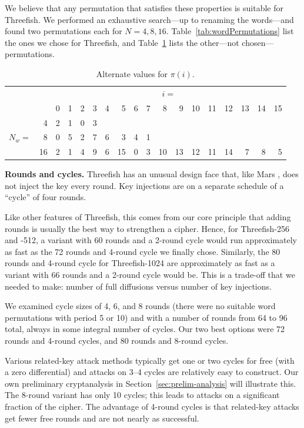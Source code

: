\documentclass[11pt,twoside]{article}
\begin{document}
We believe that any permutation that satisfies these properties is suitable for Threefish.  We performed an exhaustive search---up to renaming the words---and found two permutations each for $N=4,8,16$.  Table~\ref{tab:wordPermutations} list the ones we chose for Threefish, and Table~\ref{tab:altwordPermutations} lists the other---not chosen---permutations.
%
\begin{table}[htb]
  \begin{center}
    \begin{tabular}{|r@{\,\,}r|rrrrrrrrrrrrrrrr|}
    \hline
    &&\multicolumn{16}{c|}{$i=$}\\
    &&0&1&2&3&4&5&6&7&8&9&10&11&12&13&14&15\\
    \hline
            & 4& 2 & 1 & 0 &  3 &&&&&&&&&&&&\\
    $N_w =$ & 8& 0 & 5 & 2 & 7 &  6 & 3 &  4 & 1 &&&&&&&&\\
            &16& 2 & 1 & 4 & 9 & 6 & 15 & 0 & 3 & 10 & 13 & 12 & 11 & 14 & 7 & 8 & 5 \\
    \hline
    \end{tabular}
  \end{center}\caption{Alternate values for $\pi(i)$.}
  \label{tab:altwordPermutations}
\end{table}

{\bf Rounds and cycles.}  Threefish has an unusual design face that, like Mars \cite{MARS}, does not inject the key every round.  Key injections are on a separate schedule of a ``cycle'' of four rounds.

Like other features of Threefish, this comes from our core principle that adding rounds is usually the best way to strengthen a cipher.  Hence, for Threefish-256 and -512, a variant with 60 rounds and a 2-round cycle would run approximately as fast as the 72 rounds and 4-round cycle we finally chose. Similarly, the 80 rounds and 4-round cycle for Threefish-1024 are approximately as fast as a variant with 66 rounds and a 2-round cycle would be.  This is a trade-off that we needed to make: number of full diffusions versus number of key injections.

We examined cycle sizes of 4, 6, and 8 rounds (there were no suitable word permutations with period 5 or 10) and with a number of rounds from 64 to 96 total, always in some integral number of cycles.  Our two best options were 72 rounds and 4-round cycles, and 80 rounds and 8-round cycles.

Various related-key attack methods typically get one or two cycles for free (with a zero differential) and attacks on 3--4 cycles are relatively easy to construct. Our own preliminary cryptanalysis in Section~\ref{sec:prelim-analysis} will illustrate this. The 8-round variant has only 10 cycles; this leads to attacks on a significant fraction of the cipher. The advantage of 4-round cycles is that related-key attacks get fewer free rounds and are not nearly as successful.
\end{document}

